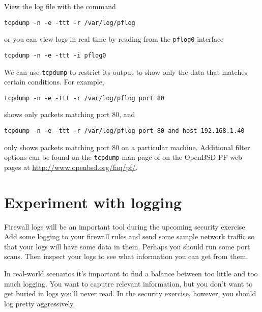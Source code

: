 \documentclass{article}
\begin{document}
View the log file with the command

\texttt{tcpdump -n -e -ttt -r /var/log/pflog}

or you can view logs in real time by reading from the \texttt{pflog0} interface

\texttt{tcpdump -n -e -ttt -i pflog0}

We can use \texttt{tcpdump} to restrict its output to show only the data that matches certain conditions.  For example,

\texttt{tcpdump -n -e -ttt -r /var/log/pflog port 80}

shows only packets matching port 80, and 

\texttt{tcpdump -n -e -ttt -r /var/log/pflog port 80 and host 192.168.1.40}

only shows packets matching port 80 on a particular machine.  Additional filter options can be found on the \texttt{tcpdump} man page of on the 
OpenBSD PF web pages at \url{http://www.openbsd.org/faq/pf/}.

\section{Experiment with logging}
Firewall logs will be an important tool during the upcoming security exercise.  Add some logging to your firewall rules and send some sample network traffic so that your logs will have some data in them. Perhaps you should run some port scans.  Then inspect your logs to see what information you can get from them.

In real-world scenarios it's important to find a balance between too little and too much logging.  You want to caputre relevant information, but you don't
want to get buried in logs you'll never read.  In the security exercise, however, you should log pretty aggressively.
\end{document}
